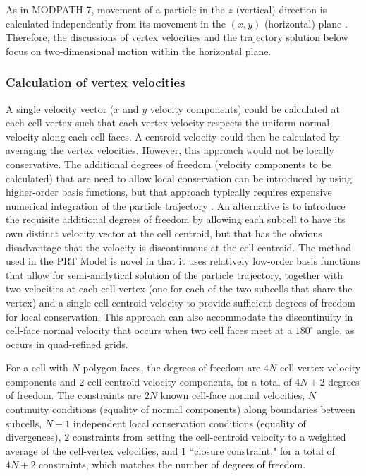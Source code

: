 As in MODPATH 7, movement of a particle in the $z$ (vertical) direction is calculated independently from its movement in the $(x, y)$ (horizontal) plane \citep{pollock2016modpath7} . Therefore, the discussions of vertex velocities and the trajectory solution below focus on two-dimensional motion within the horizontal plane.

\subsubsection{Calculation of vertex velocities}

A single velocity vector ($x$ and $y$ velocity components) could be calculated at each cell vertex such that each vertex velocity respects the uniform normal velocity along each cell faces. A centroid velocity could then be calculated by averaging the vertex velocities. However, this approach would not be locally conservative. The additional degrees of freedom (velocity components to be calculated) that are need to allow local conservation can be introduced by using higher-order basis functions, but that approach typically requires expensive numerical integration of the particle trajectory \citep{zhang2012}. An alternative is to introduce the requisite additional degrees of freedom by allowing each subcell to have its own distinct velocity vector at the cell centroid, but that has the obvious disadvantage that the velocity is discontinuous at the cell centroid. The method used in the PRT Model is novel in that it uses relatively low-order basis functions that allow for semi-analytical solution of the particle trajectory, together with two velocities at each cell vertex (one for each of the two subcells that share the vertex) and a single cell-centroid velocity to provide sufficient degrees of freedom for local conservation. This approach can also accommodate the discontinuity in cell-face normal velocity that occurs when two cell faces meet at a $180^\circ$ angle, as occurs in quad-refined grids.

For a cell with $N$ polygon faces, the degrees of freedom are $4N$ cell-vertex velocity components and $2$ cell-centroid velocity components, for a total of $4N + 2$ degrees of freedom. The constraints are $2N$ known cell-face normal velocities, $N$ continuity conditions (equality of normal components) along boundaries between subcells, $N - 1$ independent local conservation conditions (equality of divergences), $2$ constraints from setting the cell-centroid velocity to a weighted average of the cell-vertex velocities, and $1$ ``closure constraint," for a total of $4N + 2$ constraints, which matches the number of degrees of freedom.

